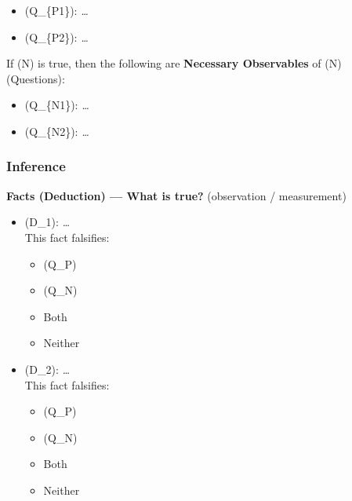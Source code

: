 \documentclass[
  letterpaper,
  DIV=11,
  numbers=noendperiod]{scrartcl}
\providecommand{\tightlist}{%
  \setlength{\itemsep}{0pt}\setlength{\parskip}{0pt}}
\begin{document}
\begin{itemize}
\tightlist
\item
  (Q\_\{P1\}): \emph{\ldots{}}
\item
  (Q\_\{P2\}): \emph{\ldots{}}
\end{itemize}

If (N) is true, then the following are \textbf{Necessary Observables} of
(N) (Questions):

\begin{itemize}
\tightlist
\item
  (Q\_\{N1\}): \emph{\ldots{}}
\item
  (Q\_\{N2\}): \emph{\ldots{}}
\end{itemize}

\subsubsection{Inference}\label{inference}

\textbf{Facts (Deduction) --- What is true?} (observation / measurement)

\begin{itemize}
\tightlist
\item
  (D\_1): \emph{\ldots{}}\\
  This fact falsifies:

  \begin{itemize}
  \tightlist
  \item[$\square$]
    (Q\_P)\\
  \item[$\square$]
    (Q\_N)\\
  \item[$\square$]
    Both\\
  \item[$\square$]
    Neither
  \end{itemize}
\item
  (D\_2): \emph{\ldots{}}\\
  This fact falsifies:

  \begin{itemize}
  \tightlist
  \item[$\square$]
    (Q\_P)\\
  \item[$\square$]
    (Q\_N)\\
  \item[$\square$]
    Both\\
  \item[$\square$]
    Neither
  \end{itemize}
\end{itemize}
\end{document}
